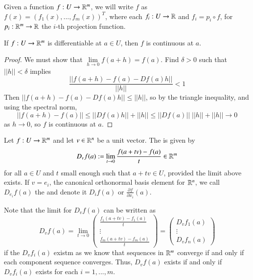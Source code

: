 \begin{note}
    Given a function $f:U\rightarrow \mathbb R^m$, we will write $f$ as $f(x) = (f_1(x),...,f_m(x))^T$, where each $f_i:U\rightarrow \mathbb R$ and $f_i = p_i\circ f$, for $p_i:\mathbb R^m\rightarrow \mathbb R$ the $i$-th projection function.
\end{note}

\begin{proposition}
    If $f:U\rightarrow \mathbb R^m$ is differentiable at $a \in U$, then $f$ is continuous at $a$.
\end{proposition}
\begin{proof}
    We must show that $\lim\limits_{h\rightarrow 0}f(a+h) = f(a)$. Find $\delta > 0$ such that $||h|| < \delta$ implies $$\frac{||f(a+h)-f(a)-Df(a)h||}{||h||} < 1$$ Then $||f(a+h) - f(a) - Df(a)h|| \leq ||h||$, so by the triangle inequality, and using the spectral norm, $$||f(a+h) - f(a)|| \leq ||Df(a)h|| + ||h|| \leq ||Df(a)||\;||h|| + ||h||\rightarrow 0$$ as $h\rightarrow 0$, so $f$ is continuous at $a$.
\end{proof}

\begin{definition}
    Let $f:U\rightarrow \mathbb R^m$ and let $v \in \mathbb R^n$ be a unit vector. The  is given by $$D_vf(a) := \lim\limits_{t\rightarrow 0}\frac{f(a+tv)-f(a)}{t} \in \mathbb R^m$$ for all $a \in U$ and $t$ small enough such that $a+tv \in U$, provided the limit above exists. If $v = e_i$, the canonical orthonormal basis element for $\mathbb R^n$, we call $D_{e_i}f(a)$ the  and denote it $D_if(a)$ or $\frac{\partial f}{\partial x_i}(a)$.
\end{definition}

Note that the limit for $D_vf(a)$ can be written as \begin{equation*}
    D_vf(a) = \lim\limits_{t\rightarrow 0}\begin{pmatrix} \frac{f_1(a+tv)-f_1(a)}{t} \\ \vdots \\ \frac{f_m(a+tv) - f_m(a)}{t} \end{pmatrix} = \begin{pmatrix} D_vf_1(a) \\ \vdots \\ D_vf_n(a)\end{pmatrix}
\end{equation*}
if the $D_vf_i(a)$ existm as we know that sequences in $\mathbb R^m$ converge if and only if each component sequence converges. Thus, $D_vf(a)$ exists if and only if $D_vf_i(a)$ exists for each $i = 1,...,m$.

